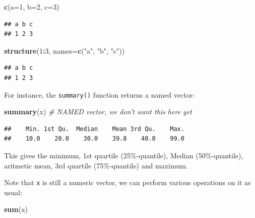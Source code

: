 \documentclass[10pt,b5paper,krantz1]{krantz}
\newenvironment{Shaded}{\begin{snugshade}}{\end{snugshade}}
\newcommand{\CommentTok}[1]{\textcolor[rgb]{0.37,0.37,0.37}{\textit{#1}}}
\newcommand{\DataTypeTok}[1]{\textcolor[rgb]{0.27,0.27,0.27}{#1}}
\newcommand{\DecValTok}[1]{\textcolor[rgb]{0.06,0.06,0.06}{#1}}
\newcommand{\KeywordTok}[1]{\textcolor[rgb]{0.27,0.27,0.27}{\textbf{#1}}}
\newcommand{\NormalTok}[1]{#1}
\newcommand{\OperatorTok}[1]{\textcolor[rgb]{0.43,0.43,0.43}{\textbf{#1}}}
\newcommand{\StringTok}[1]{\textcolor[rgb]{0.5,0.5,0.5}{#1}}
\begin{document}
\begin{Shaded}
\begin{Highlighting}[]
\KeywordTok{c}\NormalTok{(}\DataTypeTok{a=}\DecValTok{1}\NormalTok{, }\DataTypeTok{b=}\DecValTok{2}\NormalTok{, }\DataTypeTok{c=}\DecValTok{3}\NormalTok{)}
\end{Highlighting}
\end{Shaded}

\begin{verbatim}
## a b c 
## 1 2 3
\end{verbatim}

\begin{Shaded}
\begin{Highlighting}[]
\KeywordTok{structure}\NormalTok{(}\DecValTok{1}\OperatorTok{:}\DecValTok{3}\NormalTok{, }\DataTypeTok{names=}\KeywordTok{c}\NormalTok{(}\StringTok{"a"}\NormalTok{, }\StringTok{"b"}\NormalTok{, }\StringTok{"c"}\NormalTok{))}
\end{Highlighting}
\end{Shaded}

\begin{verbatim}
## a b c 
## 1 2 3
\end{verbatim}

For instance, the \texttt{summary()} function returns a named vector:

\begin{Shaded}
\begin{Highlighting}[]
\KeywordTok{summary}\NormalTok{(x) }\CommentTok{# NAMED vector, we don't want this here yet}
\end{Highlighting}
\end{Shaded}

\begin{verbatim}
##    Min. 1st Qu.  Median    Mean 3rd Qu.    Max. 
##    10.0    20.0    30.0    39.8    40.0    99.0
\end{verbatim}

This gives the minimum, 1st quartile (25\%-quantile),
Median (50\%-quantile), aritmetic mean,
3rd quartile (75\%-quantile) and maximum.

Note that \texttt{x} is still a numeric vector, we can perform various operations
on it as usual:

\begin{Shaded}
\begin{Highlighting}[]
\KeywordTok{sum}\NormalTok{(x)}
\end{Highlighting}
\end{Shaded}
\end{document}

